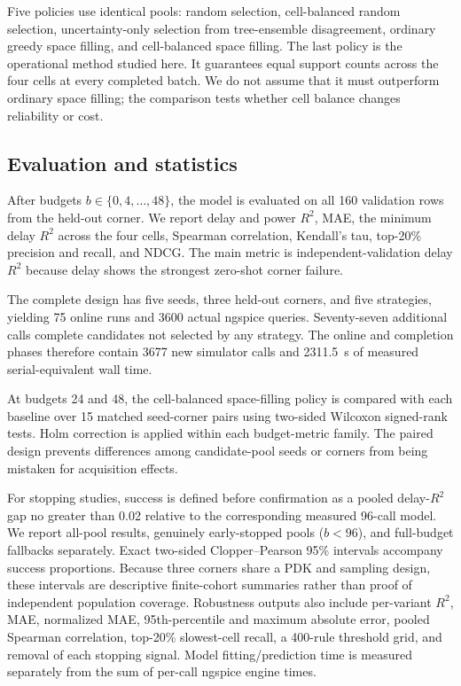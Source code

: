 \documentclass[preprint,12pt]{elsarticle}
\begin{document}
Five policies use identical pools: random selection, cell-balanced random selection, uncertainty-only selection from tree-ensemble disagreement, ordinary greedy space filling, and cell-balanced space filling. The last policy is the operational method studied here. It guarantees equal support counts across the four cells at every completed batch. We do not assume that it must outperform ordinary space filling; the comparison tests whether cell balance changes reliability or cost.

\subsection{Evaluation and statistics}

After budgets $b\in\{0,4,\ldots,48\}$, the model is evaluated on all 160 validation rows from the held-out corner. We report delay and power $R^2$, MAE, the minimum delay $R^2$ across the four cells, Spearman correlation, Kendall's tau, top-20\% precision and recall, and NDCG. The main metric is independent-validation delay $R^2$ because delay shows the strongest zero-shot corner failure.

The complete design has five seeds, three held-out corners, and five strategies, yielding 75 online runs and 3600 actual ngspice queries. Seventy-seven additional calls complete candidates not selected by any strategy. The online and completion phases therefore contain 3677 new simulator calls and 2311.5~s of measured serial-equivalent wall time.

At budgets 24 and 48, the cell-balanced space-filling policy is compared with each baseline over 15 matched seed-corner pairs using two-sided Wilcoxon signed-rank tests. Holm correction is applied within each budget-metric family. The paired design prevents differences among candidate-pool seeds or corners from being mistaken for acquisition effects.

For stopping studies, success is defined before confirmation as a pooled delay-$R^2$ gap no greater than 0.02 relative to the corresponding measured 96-call model. We report all-pool results, genuinely early-stopped pools ($b<96$), and full-budget fallbacks separately. Exact two-sided Clopper--Pearson 95\% intervals accompany success proportions. Because three corners share a PDK and sampling design, these intervals are descriptive finite-cohort summaries rather than proof of independent population coverage. Robustness outputs also include per-variant $R^2$, MAE, normalized MAE, 95th-percentile and maximum absolute error, pooled Spearman correlation, top-20\% slowest-cell recall, a 400-rule threshold grid, and removal of each stopping signal. Model fitting/prediction time is measured separately from the sum of per-call ngspice engine times.
\end{document}
